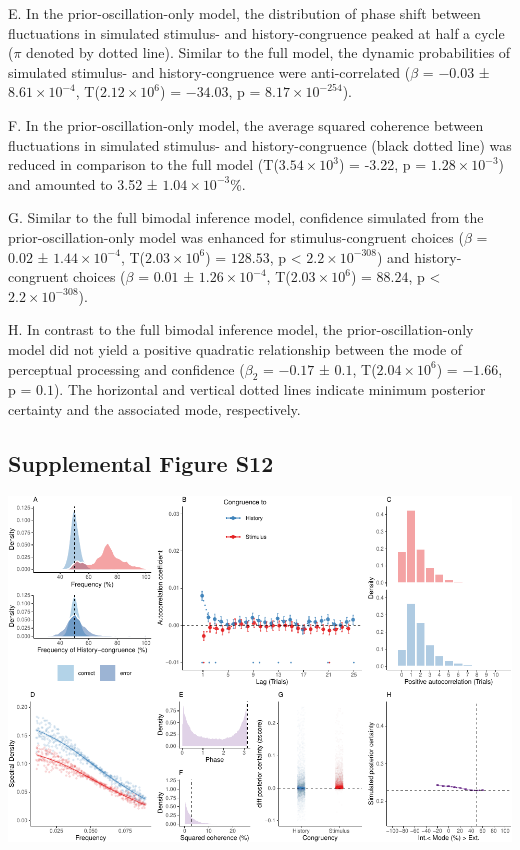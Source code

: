 \documentclass[
]{article}
\begin{document}
E. In the prior-oscillation-only model, the distribution of phase shift
between fluctuations in simulated stimulus- and history-congruence
peaked at half a cycle (\(\pi\) denoted by dotted line). Similar to the
full model, the dynamic probabilities of simulated stimulus- and
history-congruence were anti-correlated (\(\beta\) = \(-0.03\) ±
\(\ensuremath{8.61\times 10^{-4}}\),
T(\(\ensuremath{2.12\times 10^{6}}\)) = \(-34.03\), p =
\(\ensuremath{8.17\times 10^{-254}}\)).

F. In the prior-oscillation-only model, the average squared coherence
between fluctuations in simulated stimulus- and history-congruence
(black dotted line) was reduced in comparison to the full model
(T(\ensuremath{3.54\times 10^{3}}) = -3.22, p =
\(\ensuremath{1.28\times 10^{-3}}\)) and amounted to 3.52 ±
\ensuremath{1.04\times 10^{-3}}\%.

G. Similar to the full bimodal inference model, confidence simulated
from the prior-oscillation-only model was enhanced for
stimulus-congruent choices (\(\beta\) = \(0.02\) ±
\(\ensuremath{1.44\times 10^{-4}}\),
T(\(\ensuremath{2.03\times 10^{6}}\)) = \(128.53\), p < \(\ensuremath{2.2\times 10^{-308}}\)) and
history-congruent choices (\(\beta\) = \(0.01\) ±
\(\ensuremath{1.26\times 10^{-4}}\),
T(\(\ensuremath{2.03\times 10^{6}}\)) = \(88.24\), p < \(\ensuremath{2.2\times 10^{-308}}\)).

H. In contrast to the full bimodal inference model, the
prior-oscillation-only model did not yield a positive quadratic
relationship between the mode of perceptual processing and confidence
(\(\beta_2\) = \(-0.17\) ± \(0.1\),
T(\(\ensuremath{2.04\times 10^{6}}\)) = \(-1.66\), p = \(0.1\)). The
horizontal and vertical dotted lines indicate minimum posterior
certainty and the associated mode, respectively.

\newpage

\hypertarget{supplemental-figure-s12}{%
\subsection{Supplemental Figure S12}\label{supplemental-figure-s12}}

\includegraphics{modes_mouse_rev1b_files/figure-latex/Supplemental_Figure_S12-1.pdf}
\end{document}

